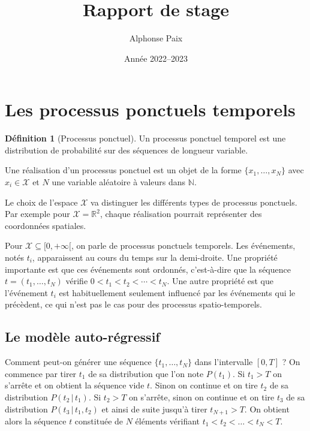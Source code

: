 \documentclass{article}
\author{Alphonse Paix}
\title{Rapport de stage}
\date{Année 2022--2023}
\theoremstyle{definition}
\newtheorem{defn}{Définition}[section]
\theoremstyle{remark}
\begin{document}
\maketitle

\setcounter{tocdepth}{2}
\tableofcontents

\section{Les processus ponctuels temporels}

\begin{defn}[Processus ponctuel]
Un processus ponctuel temporel est une distribution de probabilité
sur des séquences de longueur variable.

Une réalisation d'un processus ponctuel est un objet de la forme
$\{x_1, \dots, x_N\}$ avec $x_i \in \mathcal{X}$ et $N$ une variable
aléatoire à valeurs dans $\mathbb{N}$.
\end{defn}

Le choix de l'espace $\mathcal{X}$ va distinguer les différents types
de processus ponctuels. Par exemple pour $\mathcal{X} = \mathbb{R}^2$,
chaque réalisation pourrait représenter des coordonnées spatiales.

Pour $\mathcal{X} \subseteq [0, +\infty[$, on parle de processus
ponctuels temporels. Les événements, notés $t_i$, apparaissent au cours
du temps sur la demi-droite. Une propriété importante est que ces événements
sont ordonnés, c'est-à-dire que la séquence $t = (t_1, \dots, t_N)$
vérifie $0 < t_1 < t_2 < \cdots < t_N$. Une autre propriété est que
l'événement $t_i$ est habituellement seulement influencé par les événements
qui le précèdent, ce qui n'est pas le cas pour des processus spatio-temporels.

\subsection{Le modèle auto-régressif}

Comment peut-on générer une séquence $\{t_1, \dots, t_N\}$ dans l'intervalle
$[0, T]$ ? On commence par tirer $t_1$ de sa distribution que l'on note
$P(t_1)$. Si $t_1 > T$ on s'arrête et on obtient la séquence vide $t$.
Sinon on continue et on tire $t_2$ de sa distribution $P(t_2\, |\, t_1)$.
Si $t_2 > T$ on s'arrête, sinon on continue et on tire $t_3$
de sa distribution $P(t_3 \, |\,  t_1, t_2)$ et ainsi de suite
jusqu'à tirer $t_{N+1} > T$. On obtient alors la séquence $t$ constituée de
$N$ éléments vérifiant $t_1 < t_2 < \dots < t_N < T$.
\end{document}
